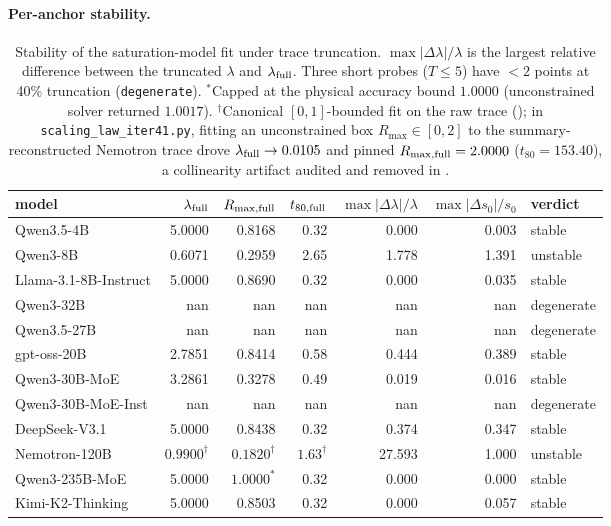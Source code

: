 \paragraph{Per-anchor stability.}
\begin{table}[ht]
\centering\small
\begin{tabular}{lrrrrrl}
\toprule
model & $\lambda_{\rm full}$ & $R_{\max,\rm full}$ & $t_{80,\rm full}$ & $\max|\Delta\lambda|/\lambda$ & $\max|\Delta s_0|/s_0$ & verdict \\
\midrule
 Qwen3.5-4B & 5.0000 & 0.8168 & 0.32 & 0.000 & 0.003 & stable \\
 Qwen3-8B & 0.6071 & 0.2959 & 2.65 & 1.778 & 1.391 & unstable \\
 Llama-3.1-8B-Instruct & 5.0000 & 0.8690 & 0.32 & 0.000 & 0.035 & stable \\
 Qwen3-32B & nan & nan & nan & nan & nan & degenerate \\
 Qwen3.5-27B & nan & nan & nan & nan & nan & degenerate \\
 gpt-oss-20B & 2.7851 & 0.8414 & 0.58 & 0.444 & 0.389 & stable \\
 Qwen3-30B-MoE & 3.2861 & 0.3278 & 0.49 & 0.019 & 0.016 & stable \\
 Qwen3-30B-MoE-Inst & nan & nan & nan & nan & nan & degenerate \\
 DeepSeek-V3.1 & 5.0000 & 0.8438 & 0.32 & 0.374 & 0.347 & stable \\
 Nemotron-120B & $0.9900^{\dagger}$ & $0.1820^{\dagger}$ & $1.63^{\dagger}$ & 27.593 & 1.000 & unstable \\
 Qwen3-235B-MoE & 5.0000 & $1.0000^{\ast}$ & 0.32 & 0.000 & 0.000 & stable \\
 Kimi-K2-Thinking & 5.0000 & 0.8503 & 0.32 & 0.000 & 0.057 & stable \\
\bottomrule
\end{tabular}
\caption{Stability of the saturation-model fit under trace truncation. $\max|\Delta\lambda|/\lambda$ is the largest relative difference between the truncated $\lambda$ and $\lambda_{\rm full}$. Three short probes ($T \le 5$) have $<2$ points at 40\% truncation (\texttt{degenerate}). $^{\ast}$Capped at the physical accuracy bound $1.0000$ (unconstrained solver returned $1.0017$). $^{\dagger}$Canonical $[0,1]$-bounded fit on the raw trace (); in \texttt{scaling\_law\_iter41.py}, fitting an unconstrained box $R_{\max} \in [0, 2]$ to the summary-reconstructed Nemotron trace drove $\lambda_{\rm full} \to 0.0105$ and pinned $R_{\max,\rm full} = 2.0000$ ($t_{80} = 153.40$), a collinearity artifact audited and removed in .}
\label{tab:iter41-stability}
\end{table}
